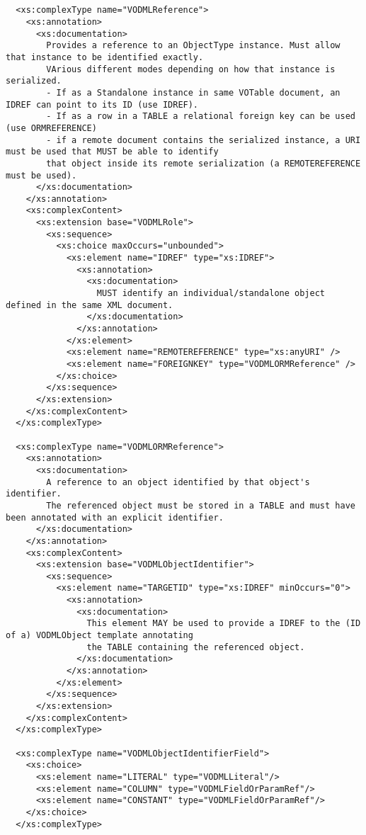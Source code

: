 \documentclass[11pt,a4paper]{ivoa}
\begin{document}
\begin{lstlisting}[label=lst:mapping,caption=VOTable schema extension for VO-DML mapping,frame=tb]
  

  <xs:complexType name="VODMLReference">
    <xs:annotation>
      <xs:documentation>
        Provides a reference to an ObjectType instance. Must allow that instance to be identified exactly.
        VArious different modes depending on how that instance is serialized.
        - If as a Standalone instance in same VOTable document, an IDREF can point to its ID (use IDREF).
        - If as a row in a TABLE a relational foreign key can be used (use ORMREFERENCE)
        - if a remote document contains the serialized instance, a URI must be used that MUST be able to identify 
        that object inside its remote serialization (a REMOTEREFERENCE must be used).
      </xs:documentation>
    </xs:annotation>
    <xs:complexContent>
      <xs:extension base="VODMLRole">
        <xs:sequence>
          <xs:choice maxOccurs="unbounded">
            <xs:element name="IDREF" type="xs:IDREF">
              <xs:annotation>
                <xs:documentation>
                  MUST identify an individual/standalone object defined in the same XML document.
                </xs:documentation>
              </xs:annotation>
            </xs:element>
            <xs:element name="REMOTEREFERENCE" type="xs:anyURI" />
            <xs:element name="FOREIGNKEY" type="VODMLORMReference" />
          </xs:choice>
        </xs:sequence>
      </xs:extension>
    </xs:complexContent>
  </xs:complexType>

  <xs:complexType name="VODMLORMReference">
    <xs:annotation>
      <xs:documentation>
        A reference to an object identified by that object's identifier.
        The referenced object must be stored in a TABLE and must have been annotated with an explicit identifier.
      </xs:documentation>
    </xs:annotation>
    <xs:complexContent>
      <xs:extension base="VODMLObjectIdentifier">
        <xs:sequence>
          <xs:element name="TARGETID" type="xs:IDREF" minOccurs="0">
            <xs:annotation>
              <xs:documentation>
                This element MAY be used to provide a IDREF to the (ID of a) VODMLObject template annotating
                the TABLE containing the referenced object.
              </xs:documentation>
            </xs:annotation>
          </xs:element>
        </xs:sequence>
      </xs:extension>
    </xs:complexContent>
  </xs:complexType>

  <xs:complexType name="VODMLObjectIdentifierField">
    <xs:choice>
      <xs:element name="LITERAL" type="VODMLLiteral"/>
      <xs:element name="COLUMN" type="VODMLFieldOrParamRef"/>
      <xs:element name="CONSTANT" type="VODMLFieldOrParamRef"/>
    </xs:choice>
  </xs:complexType>


\end{lstlisting}
\end{document}
